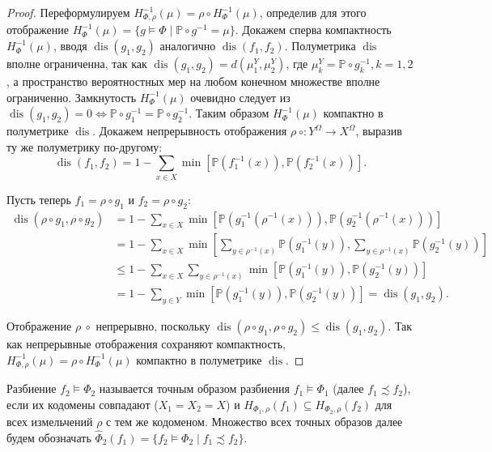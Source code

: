 \begin{proof}
	Переформулируем $H_{\Phi,\rho}^{-1}(\mu) = \rho \circ H_{\Phi}^{-1}(\mu)$, определив для этого отображение $H_{\Phi}^{-1}(\mu) = \{g \models \Phi \mid \mathbb{P} \circ g^{-1} = \mu\}$. Докажем сперва компактность $H_{\Phi}^{-1}(\mu)$, вводя $\operatorname{dis}(g_1, g_2)$ аналогично $\operatorname{dis}(f_1, f_2)$. Полуметрика $\operatorname{dis}$ вполне ограниченна, так как $\operatorname{dis}(g_1, g_2) = d(\mu^Y_1, \mu^Y_2)$, где $\mu^Y_k = \mathbb{P} \circ g_k^{-1}, k=1,2$, а пространство вероятностных мер на любом конечном множестве вполне ограниченно. Замкнутость $H_{\Phi}^{-1}(\mu)$ очевидно следует из $\operatorname{dis}(g_1, g_2) = 0 \Leftrightarrow \mathbb{P} \circ g_1^{-1} = \mathbb{P} \circ g_2^{-1}$. Таким образом $H_{\Phi}^{-1}(\mu)$ компактно в полуметрике $\operatorname{dis}$. Докажем непрерывность отображения $\rho\ \circ : Y^\Omega \rightarrow X^\Omega$, выразив ту же полуметрику по-другому:
	\begin{equation*}
		\operatorname{dis}(f_1, f_2) = 1 - \sum_{x \in X} \min \left[\mathbb{P}(f_1^{-1}(x)), \mathbb{P}(f_2^{-1}(x))\right].
	\end{equation*}
	
	Пусть теперь $f_1 = \rho \circ g_1$ и $f_2 = \rho \circ g_2$:
	\begin{align*}
		\operatorname{dis}(\rho \circ g_1, \rho \circ g_2) &= 1 - \sum_{x \in X} \min \left[\mathbb{P}(g_1^{-1}(\rho^{-1}(x))), \mathbb{P}(g_2^{-1}(\rho^{-1}(x)))\right] \\
		&= 1 - \sum_{x \in X} \min \left[\sum_{y \in \rho^{-1}(x)} \mathbb{P}(g_1^{-1}(y)), \sum_{y \in \rho^{-1}(x)} \mathbb{P}(g_2^{-1}(y))\right] \\
		&\le 1 - \sum_{x \in X} \sum_{y \in \rho^{-1}(x)} \min \left[\mathbb{P}(g_1^{-1}(y)), \mathbb{P}(g_2^{-1}(y))\right] \\
		&= 1 - \sum_{y \in Y} \min \left[\mathbb{P}(g_1^{-1}(y)), \mathbb{P}(g_2^{-1}(y))\right] = \operatorname{dis}(g_1, g_2).
	\end{align*}
	
	Отображение $\rho\ \circ$ непрерывно, поскольку $\operatorname{dis}(\rho \circ g_1, \rho \circ g_2) \le \operatorname{dis}(g_1, g_2)$. Так как непрерывные отображения сохраняют компактность\cite[с.~199]{Engelking}, $H_{\Phi,\rho}^{-1}(\mu) = \rho \circ H_{\Phi}^{-1}(\mu)$ компактно в полуметрике $\operatorname{dis}$.
\end{proof}

\begin{definition}
	Разбиение $f_2 \models \Phi_2$ называется точным образом разбиения $f_1 \models \Phi_1$ (далее $f_1 \precsim f_2$), если их кодомены совпадают ($X_1 = X_2 = X$) и $H_{\Phi_1,\rho}(f_1) \subseteq H_{\Phi_2,\rho}(f_2)$ для всех измельчений $\rho$ с тем же кодоменом. Множество всех точных образов далее будем обозначать $\widehat{\Phi}_2(f_1) = \{f_2 \models \Phi_2 \mid f_1 \precsim f_2\}$.
\end{definition}

